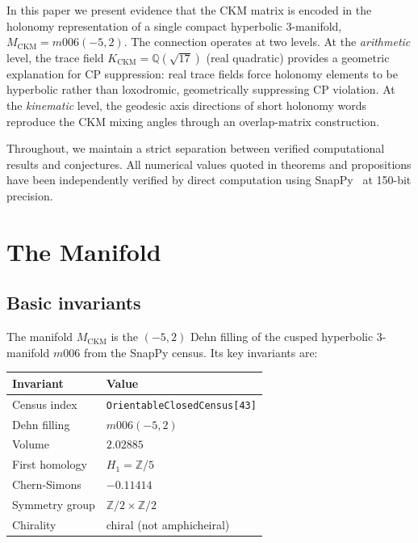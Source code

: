 \documentclass[11pt,a4paper]{article}
\theoremstyle{definition}
\theoremstyle{remark}
\newcommand{\MCKM}{M_{\mathrm{CKM}}}
\newcommand{\KCKM}{K_{\mathrm{CKM}}}
\newcommand{\Zfive}{\mathbb{Z}/5}
\begin{document}
In this paper we present evidence that the CKM matrix is encoded in
the holonomy representation of a single compact hyperbolic 3-manifold,
$\MCKM = m006(-5,2)$. The connection operates at two levels.
At the \emph{arithmetic} level, the trace field
$\KCKM = \mathbb{Q}(\sqrt{17})$ (real quadratic) provides a geometric
explanation for CP suppression: real trace fields force holonomy
elements to be hyperbolic rather than loxodromic, geometrically
suppressing CP violation. At the \emph{kinematic} level, the geodesic
axis directions of short holonomy words reproduce the CKM mixing
angles through an overlap-matrix construction.

Throughout, we maintain a strict separation between verified
computational results and conjectures. All numerical values quoted
in theorems and propositions have been independently verified by
direct computation using SnapPy~\cite{SnapPy} at 150-bit precision.

\section{The Manifold}
\label{sec:manifold}

\subsection{Basic invariants}

The manifold $\MCKM$ is the $(-5,2)$ Dehn filling of the cusped
hyperbolic 3-manifold $m006$ from the SnapPy census. Its key
invariants are:

\begin{center}
\begin{tabular}{ll}
\toprule
Invariant & Value \\
\midrule
Census index & \texttt{OrientableClosedCensus[43]} \\
Dehn filling & $m006(-5,2)$ \\
Volume & $2.02885$ \\
First homology & $H_1 = \Zfive$ \\
Chern-Simons & $-0.11414$ \\
Symmetry group & $\mathbb{Z}/2 \times \mathbb{Z}/2$ \\
Chirality & chiral (not amphicheiral) \\
\bottomrule
\end{tabular}
\end{center}
\end{document}
